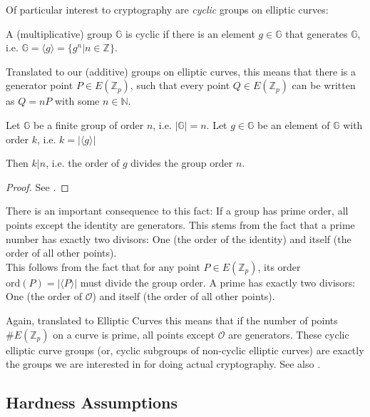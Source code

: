 Of particular interest to cryptography are \emph{cyclic} groups on elliptic curves:
\begin{definition}
    A (multiplicative) group $\mathbb{G}$ is cyclic if there is an element $g \in \mathbb{G}$ that generates $\mathbb{G}$, i.e. $\mathbb{G} = \langle g \rangle = \{g^n | n \in \mathbb{Z}\}$.
\end{definition}

Translated to our (additive) groups on elliptic curves, this means that there is a generator point $P \in E(\mathbb{Z}_p)$, such that every point $Q \in E(\mathbb{Z}_p)$ can be written as $Q = nP$ with some $n \in \mathbb{N}$.

\begin{theorem}\cite{katz_introduction_2015}
    Let $\mathbb{G}$ be a finite group of order $n$, i.e. $|\mathbb{G}| = n$.
    Let $g \in \mathbb{G}$ be an element of $\mathbb{G}$ with order $k$, i.e. $k = |\langle g \rangle |$

    Then $k|n$, i.e. the order of $g$ divides the group order $n$.
\end{theorem}
\begin{proof}
    See \cite*[Proposition 8.54]{katz_introduction_2015}.
\end{proof}

There is an important consequence to this fact: If a group has prime order, all points except the identity are generators.
This stems from the fact that a prime number has exactly two divisors: One (the order of the identity) and itself (the order of all other points).
\\
This follows from the fact that for any point $P \in E(\mathbb{Z}_p)$, its order $\text{ord}(P) = | \langle P \rangle |$ must divide the group order.
A prime has exactly two divisors: One (the order of $\mathcal{O}$) and itself (the order of all other points).

Again, translated to Elliptic Curves this means that if the number of points $\#E(\mathbb{Z}_p)$ on a curve is prime, all points except $\mathcal{O}$ are generators.
These cyclic elliptic curve groups (or, cyclic subgroups of non-cyclic elliptic curves) are exactly the groups we are interested in for doing actual cryptography. See also \cite[p.~321]{katz_introduction_2015}.

\subsection{Hardness Assumptions}

